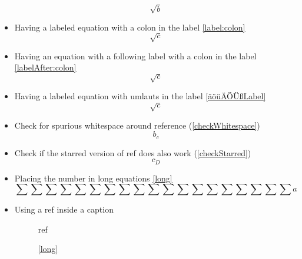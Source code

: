 \documentclass{article}
\def\ifautonum#1{#1}%
\def\ifautonum#1{}%
\def\ifcleveref#1{#1}%
\def\ifcleveref#1{}%
\begin{document}
\begin{itemize}
			\begin{equation}\label{äöüÄÖÜß?:, 3075µ!/§}
				\sqrt{b}
			\end{equation}
		\item Having a labeled equation with a colon in the label \ref{label:colon}
			\begin{equation}\label{label:colon}
				\sqrt{c}
			\end{equation}
		\item Having an equation with a following label with a colon in the label \ref{labelAfter:colon}
			\begin{equation}
				\sqrt{c}\label{labelAfter:colon}
			\end{equation}
		\item Having a labeled equation with umlauts in the label \ref{äöüÄÖÜßLabel}
			\begin{equation}\label{äöüÄÖÜßLabel}
				\sqrt{c}
			\end{equation}
		\item Check for spurious whitespace around reference (\ref{checkWhitespace})
			\begin{equation}\label{checkWhitespace}
				b_c
			\end{equation}
		\item Check if the starred version of ref does also work (\ref*{checkStarred})
			\begin{equation}\label{checkStarred}
				c_D
			\end{equation}
		\ifcleveref{
			\item Check if the starred version of cref does also work (\cref*{checkStarredCref})
				\begin{equation}\label{checkStarredCref}
					d_E
				\end{equation}
		}
		\item Placing the number in long equations \ref{long}
			\begin{equation}\label{long}
				\sum\sum\sum\sum\sum\sum\sum\sum\sum\sum\sum\sum\sum\sum\sum\sum\sum\sum\sum a
			\end{equation}
		\ifautonum{
			\item Printing the number without referencing (needs autonum)
				\begin{equation+}
					E = mgh
				\end{equation+}
		}
		\item Using a ref inside a caption
			\begin{figure}
				ref
				\caption{\ref{long}}
			\end{figure}

\end{itemize}
\end{document}
